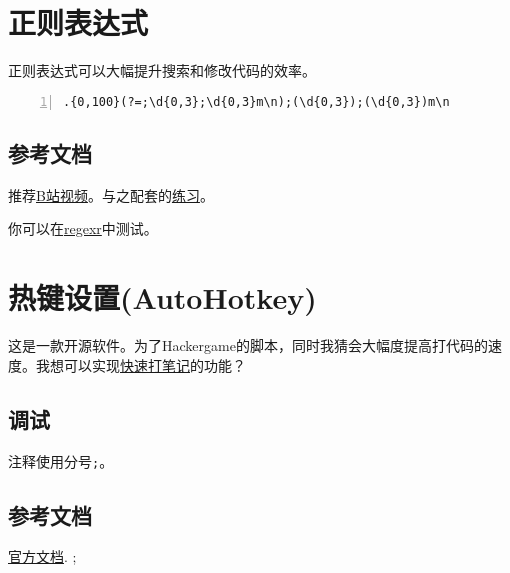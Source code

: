 \documentclass[11pt]{amsart}
\begin{document}
\section{正则表达式}
正则表达式可以大幅提升搜索和修改代码的效率。
\begin{lstlisting}[numbers=left,numberstyle=\tiny,numbersep=10pt]
.{0,100}(?=;\d{0,3};\d{0,3}m\n);(\d{0,3});(\d{0,3})m\n
\end{lstlisting}
\subsection{参考文档}
推荐\href{https://www.bilibili.com/video/BV19t4y1y7qP}{B站视频}。与之配套的\href{https://codejiaonang.com/#/course/regex_chapter1/}{练习}。

你可以在\href{https://regexr-cn.com/}{regexr}中测试。
\section{热键设置(AutoHotkey)}
这是一款开源软件。为了Hackergame的脚本，同时我猜会大幅度提高打代码的速度。我想可以实现\href{https://zhuanlan.zhihu.com/p/60049290}{快速打笔记}的功能？
\subsection{调试}

注释使用分号\lstinline|;|。

\subsection{参考文档}
\href{https://wyagd001.github.io/zh-cn/docs/AutoHotkey.htm}{官方文档}.
;
\end{document}

